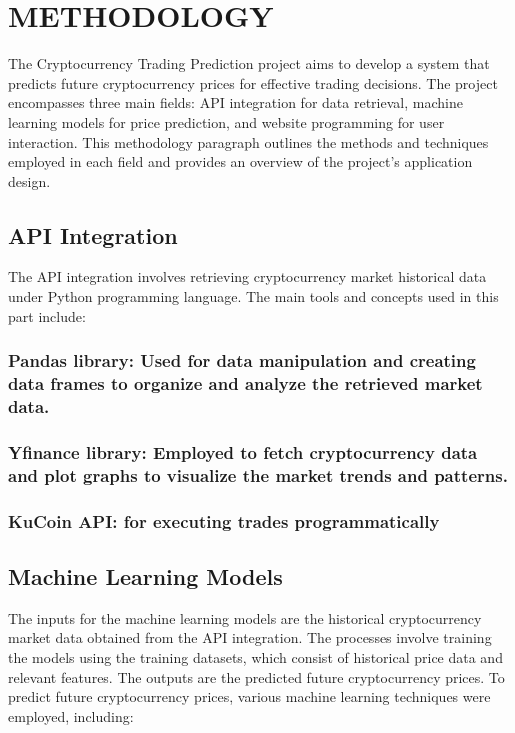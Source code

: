 \chapter{METHODOLOGY}

The Cryptocurrency Trading Prediction project aims to develop a system that predicts future cryptocurrency prices for effective trading decisions. The project encompasses three main fields: API integration for data retrieval, machine learning models for price prediction, and website programming for user interaction. This methodology paragraph outlines the methods and techniques employed in each field and provides an overview of the project's application design.

\setcounter{chapter}{3}

\section{API Integration}
The API integration involves retrieving cryptocurrency market historical data under Python programming language. The main tools and concepts used in this part include:
\subsection{Pandas library: Used for data manipulation and creating data frames to organize and analyze the retrieved market data.}
\subsection{Yfinance library: Employed to fetch cryptocurrency data and plot graphs to visualize the market trends and patterns.}
\subsection{KuCoin API: for executing trades programmatically}

\section{Machine Learning Models}
The inputs for the machine learning models are the historical cryptocurrency market data obtained from the API integration. The processes involve training the models using the training datasets, which consist of historical price data and relevant features. The outputs are the predicted future cryptocurrency prices.
To predict future cryptocurrency prices, various machine learning techniques were employed, including:
